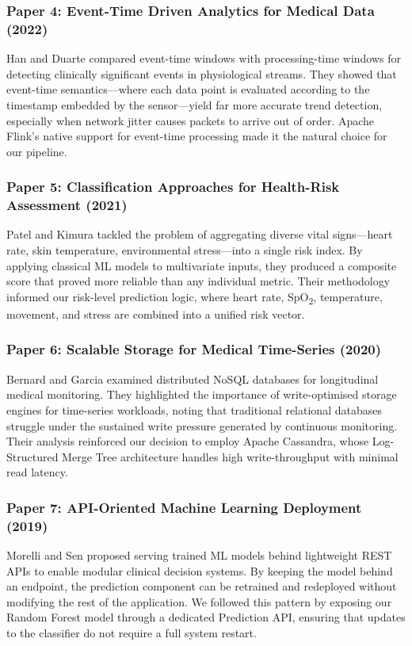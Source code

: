 \documentclass[12pt, a4paper, oneside]{report}
\begin{document}
\subsubsection{Paper 4: Event-Time Driven Analytics for Medical Data (2022)}
Han and Duarte \cite{ref4} compared event-time windows with processing-time windows for detecting clinically significant events in physiological streams. They showed that event-time semantics---where each data point is evaluated according to the timestamp embedded by the sensor---yield far more accurate trend detection, especially when network jitter causes packets to arrive out of order. Apache Flink's native support for event-time processing made it the natural choice for our pipeline.

\subsubsection{Paper 5: Classification Approaches for Health-Risk Assessment (2021)}
Patel and Kimura \cite{ref5} tackled the problem of aggregating diverse vital signs---heart rate, skin temperature, environmental stress---into a single risk index. By applying classical ML models to multivariate inputs, they produced a composite score that proved more reliable than any individual metric. Their methodology informed our risk-level prediction logic, where heart rate, SpO\textsubscript{2}, temperature, movement, and stress are combined into a unified risk vector.

\subsubsection{Paper 6: Scalable Storage for Medical Time-Series (2020)}
Bernard and Garcia \cite{ref6} examined distributed NoSQL databases for longitudinal medical monitoring. They highlighted the importance of write-optimised storage engines for time-series workloads, noting that traditional relational databases struggle under the sustained write pressure generated by continuous monitoring. Their analysis reinforced our decision to employ Apache Cassandra, whose Log-Structured Merge Tree architecture handles high write-throughput with minimal read latency.

\subsubsection{Paper 7: API-Oriented Machine Learning Deployment (2019)}
Morelli and Sen \cite{ref7} proposed serving trained ML models behind lightweight REST APIs to enable modular clinical decision systems. By keeping the model behind an endpoint, the prediction component can be retrained and redeployed without modifying the rest of the application. We followed this pattern by exposing our Random Forest model through a dedicated Prediction API, ensuring that updates to the classifier do not require a full system restart.
\end{document}
